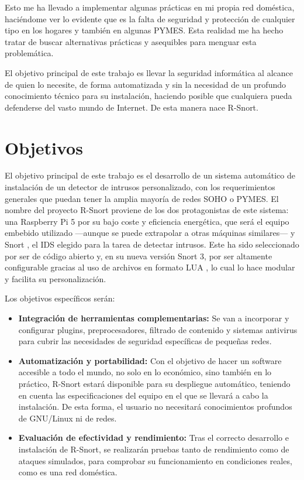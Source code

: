 \documentclass[11pt,a4paper,twoside]{report}
\begin{document}
Esto me ha llevado a implementar algunas prácticas en mi propia red doméstica, haciéndome ver lo evidente que es la falta de seguridad y protección de cualquier tipo en los hogares y también en algunas PYMES. Esta realidad me ha hecho tratar de buscar alternativas prácticas y asequibles para menguar esta problemática.\newline

El objetivo principal de este trabajo es llevar la seguridad informática al alcance de quien lo necesite, de forma automatizada y sin la necesidad de un profundo conocimiento técnico para su instalación, haciendo posible que cualquiera pueda defenderse del vasto mundo de Internet. De esta manera nace R-Snort.\newline

\chapter{Objetivos}
El objetivo principal de este trabajo es el desarrollo de un sistema automático de instalación de un detector de intrusos personalizado, con los requerimientos generales que puedan tener la amplia mayoría de redes SOHO o PYMES. El nombre del proyecto R-Snort proviene de los dos protagonistas de este sistema: una Raspberry Pi 5 \cite{rodriguez2018cluster} por su bajo coste y eficiencia energética, que será el equipo embebido utilizado —aunque se puede extrapolar a otras máquinas similares— y Snort \cite{roesch1999snort}, el IDS elegido para la tarea de detectar intrusos. Este ha sido seleccionado por ser de código abierto y, en su nueva versión Snort 3, por ser altamente configurable gracias al uso de archivos en formato LUA \cite{snort3_official}, lo cual lo hace modular y facilita su personalización.\newline

Los objetivos específicos serán:

\begin{itemize}
    \item \textbf{Integración de herramientas complementarias:} Se van a incorporar y configurar plugins, preprocesadores, filtrado de contenido y sistemas antivirus para cubrir las necesidades de seguridad específicas de pequeñas redes.
    
    \item \textbf{Automatización y portabilidad:} Con el objetivo de hacer un software accesible a todo el mundo, no solo en lo económico, sino también en lo práctico, R-Snort estará disponible para su despliegue automático, teniendo en cuenta las especificaciones del equipo en el que se llevará a cabo la instalación. De esta forma, el usuario no necesitará conocimientos profundos de GNU/Linux ni de redes.
    
    \item \textbf{Evaluación de efectividad y rendimiento:} Tras el correcto desarrollo e instalación de R-Snort, se realizarán pruebas tanto de rendimiento como de ataques simulados, para comprobar su funcionamiento en condiciones reales, como es una red doméstica.
    
\end{itemize}
\end{document}
